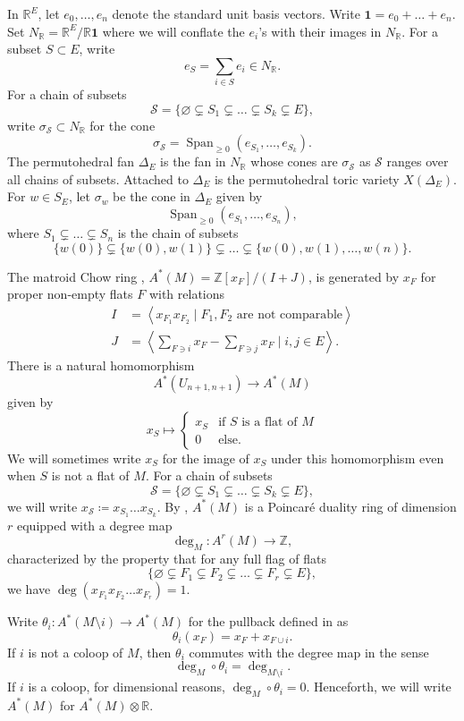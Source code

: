 \documentclass[10pt,a4paper]{amsart}
\numberwithin{equation}{section}
\numberwithin{figure}{section}
\newcommand{\R}{\mathbb{R}}
\newcommand{\Z}{\mathbb{Z}}
\DeclareMathOperator{\Span}{Span}
\theoremstyle{definition}
\theoremstyle{remark}
\begin{document}
In $\R^{E}$, let $e_0,\dots,e_n$ denote the standard unit basis vectors. Write $\mathbf{1}=e_0+\dots+e_n$.
Set $N_{\R}=\R^{E}/\R\mathbf{1}$ where we will conflate the $e_i$'s with their images in $N_{\R}$. For a subset $S\subset E$, write
\[e_S=\sum_{i\in S} e_i \in N_{\R}.\]
For a chain of subsets 
\[\mathcal{S}=\{\varnothing\subsetneq S_1\subsetneq \dots\subsetneq S_k\subsetneq E\},\]
write $\sigma_{\mathcal{S}}\subset N_{\R}$ for the cone
\[\sigma_{\mathcal{S}}=\Span_{\geq 0}(e_{S_1},\dots,e_{S_k}).\]
The permutohedral fan $\Delta_{E}$ is the fan in $N_{\R}$ whose cones are $\sigma_{\mathcal{S}}$ as $\mathcal{S}$ ranges over all chains of subsets.
Attached to $\Delta_{E}$ is the permutohedral toric variety $X(\Delta_{E})$.
For $w\in S_{E}$, let $\sigma_w$ be the cone in $\Delta_{E}$ given by
\[\Span_{\geq 0}(e_{S_1},\dots,e_{S_n}),\]
where $S_1\subsetneq \dots\subsetneq S_n$ is the chain of subsets
\[\{w(0)\}\subsetneq \{w(0),w(1)\}\subsetneq\dots\subsetneq \{w(0),w(1),\dots,w(n)\}.\]

The matroid Chow ring \cite{FY:chow}, $A^*(M)=\Z[x_F]/(I+J)$, is generated by $x_F$ for proper non-empty flats $F$ with relations
\begin{align*}
I&=\left\langle x_{F_1}x_{F_2}\mid F_1,F_2 \text{ are not comparable}\right\rangle\\
J&=\left\langle \sum_{F\ni i} x_F- \sum_{F\ni j} x_F\mid i,j\in E\right\rangle.
\end{align*}
There is a natural homomorphism 
\[A^*(U_{n+1,n+1})\to A^*(M)\]
given by
\[x_S\mapsto 
\begin{cases}
x_S &\text{if $S$ is a flat of $M$}\\
0 &\text{else}.
\end{cases}\]
We will sometimes write $x_S$ for the image of $x_S$ under this homomorphism even when $S$ is not a flat of $M$. For a chain of subsets 
\[\mathcal{S}=\{\varnothing\subsetneq S_1\subsetneq\dots\subsetneq S_k\subsetneq E\},\]
we will write $x_{\mathcal{S}}\coloneqq x_{S_1}\dots x_{S_k}$.
By \cite{AHK}, $A^*(M)$ is a Poincar\'{e} duality ring of dimension $r$ equipped with a degree map
\[\deg_M\colon A^r(M)\to \Z,\]
characterized by the property that for any full flag of flats
\[\{\varnothing \subsetneq F_1\subsetneq F_2\subsetneq \dots\subsetneq F_r\subsetneq E\},\]
we have $\deg(x_{F_1}x_{F_2}\dots x_{F_r})=1.$

Write $\theta_i\colon A^*(M\setminus i)\to A^*(M)$ for the pullback defined in \cite[Section~3]{BHMPW:semismall} as
\[\theta_i(x_F)=x_F+x_{F\cup i}.\]
If $i$ is not a coloop of $M$, then $\theta_i$ commutes with the degree map in the sense
\[\deg_M\circ \theta_i=\deg_{M\setminus i}.\]
If $i$ is a coloop, for dimensional reasons, $\deg_M\circ\theta_i=0$. Henceforth, we will write $A^*(M)$ for $A^*(M)\otimes\R$.
\end{document}
